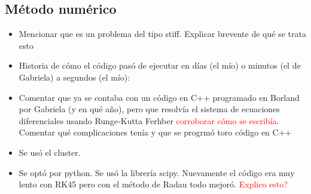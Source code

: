 \documentclass[aps,prb,onecolumn,superscriptaddress,floatfix,longbibliography,10pt]{revtex4-2}
\begin{document}
\subsection{Método numérico}

\begin{itemize}
  \item Mencionar que es un problema del tipo stiff. Explicar brevente de qué se trata esto
  \item Historia de cómo el código pasó de ejecutar en días (el mío) o minutos (el de Gabriela) a segundos (el mío):
  \item Comentar que ya se contaba con un código en C++ programado en Borland por Gabriela (y en qué año), pero que resolvía el sistema de ecuaciones diferenciales usando Runge-Kutta Ferhber \textcolor{red}{corroborar cómo se escribía}. Comentar qué complicaciones tenía y que se progrmó toro código en C++
  \item Se usó el cluster.
  \item Se optó por python. Se usó la librería scipy. Nuevamente el código era muy lento con RK45 pero con el método de Radau todo mejoró. \textcolor{red}{Explico esto?}
\end{itemize}
\end{document}
